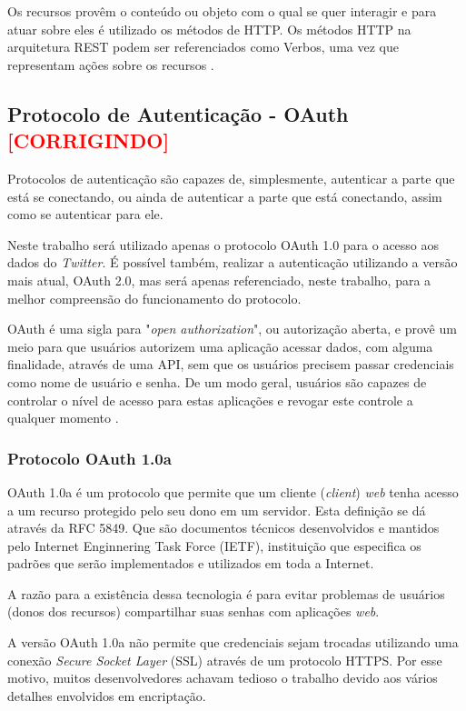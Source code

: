 Os recursos provêm o conteúdo ou objeto com o qual se quer interagir e para atuar sobre eles é utilizado os métodos de HTTP. Os métodos HTTP na arquitetura REST podem ser referenciados como Verbos, uma vez que representam ações sobre os recursos \cite{rest-book}.


\subsection{Protocolo de Autenticação - OAuth \textbf{\textcolor{red}{[CORRIGINDO]}}}
Protocolos de autenticação são capazes de, simplesmente, autenticar a parte que está se conectando, ou ainda de autenticar a parte que está conectando, assim como se autenticar para ele.

Neste trabalho será utilizado apenas o protocolo OAuth 1.0 para o acesso aos dados do \textit{Twitter}. É possível também, realizar a autenticação utilizando a versão mais atual, OAuth 2.0, mas será apenas referenciado, neste trabalho, para a melhor compreensão do funcionamento do protocolo.

OAuth é uma sigla para "\textit{open authorization}", ou autorização aberta, e provê um meio para que usuários autorizem uma aplicação acessar dados, com alguma finalidade, através de uma API, sem que os usuários precisem passar credenciais como nome de usuário e senha. De um modo geral, usuários são capazes de controlar o nível de acesso para estas aplicações e revogar este controle a qualquer momento \cite{mining-social-web}.

\subsubsection{Protocolo OAuth 1.0a}
OAuth 1.0a é um protocolo que permite que um cliente (\textit{client}) \textit{web} tenha acesso a um recurso protegido pelo seu dono em um servidor. Esta definição se dá através da RFC 5849. Que são documentos técnicos desenvolvidos e mantidos pelo Internet Enginnering Task Force (IETF), instituição que especifica os padrões que serão implementados e utilizados em toda a Internet.

A razão para a existência dessa tecnologia é para evitar problemas de usuários (donos dos recursos) compartilhar suas senhas com aplicações \textit{web}.

A versão OAuth 1.0a não permite que credenciais sejam trocadas utilizando uma conexão \textit{Secure Socket Layer} (SSL) através de um protocolo HTTPS. Por esse motivo, muitos desenvolvedores achavam tedioso o trabalho devido aos vários detalhes envolvidos em encriptação.

